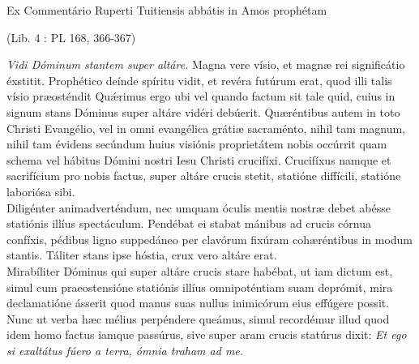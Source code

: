 \documentclass[options]{article}
\begin{document}
	Ex Commentário Ruperti Tuitiensis abbátis in Amos prophétam
	\begin{flushright}
		(Lib. 4 : PL 168, 366-367)
	\end{flushright}
\emph{Vidi Dóminum stantem super altáre.}
Magna vere vísio, et magnæ rei significátio éxstitit. Prophético deínde spíritu vidit, et revéra futúrum erat, quod illi talis vísio præosténdit Qu\'{æ}rimus ergo ubi vel quando factum sit tale quid, cuius in signum stans Dóminus super altáre vidéri debúerit. Quæréntibus autem in toto Christi Evangélio, vel in omni evangélica grátiæ sacraménto, nihil tam magnum, nihil tam évidens secúndum huius visiónis proprietátem nobis occúrrit quam schema vel hábitus Dómini nostri Iesu Christi crucifíxi. Crucifíxus namque et sacrifícium pro nobis factus, super altáre crucis stetit, statióne diffícili, statióne laboriósa sibi.\\
Diligénter animadverténdum, nec umquam óculis mentis nostræ debet abésse statiónis illíus spectáculum. Pendébat ei stabat mánibus ad crucis córnua confíxis, pédibus ligno suppedáneo per clavórum fixúram cohæréntibus in modum stantis. Táliter stans ipse hóstia, crux vero altáre erat.\\
Mirabíliter Dóminus qui super altáre crucis stare habébat, ut iam dictum est, simul cum praeostensióne statiónis illíus omnipoténtiam suam deprómit, mira declamatióne ásserit quod manus suas nullus inimicórum eius effúgere possit. Nunc ut verba hæc mélius perpéndere queámus, simul recordémur illud quod idem homo factus iamque passúrus, sive super aram crucis statúrus dixit: 
\emph{Et ego si exaltátus fúero a terra, ómnia traham ad me.}
\end{document}

